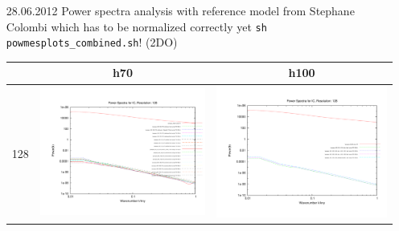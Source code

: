 \begin{itemize}
\begin{table}
\begin{tabular}{l|c|c}
 \end{tabular}
\end{table}

\item[28.06.2012]
Power spectra analysis with reference model from Stephane Colombi which has to be 
normalized correctly yet \texttt{sh powmesplots\_combined.sh}! (2DO) 

\begin{table}
\begin{tabular}{l|c|c}
 & h70 & h100 \\
\hline 
 128 & \includegraphics[scale=0.2]{analysis/powerspectra/IC_powspec_combined_128_h70.pdf} & \includegraphics[scale=0.2]{analysis/powerspectra/IC_powspec_combined_128_h100.pdf} \\

\end{tabular}
\end{table}
\end{itemize}
